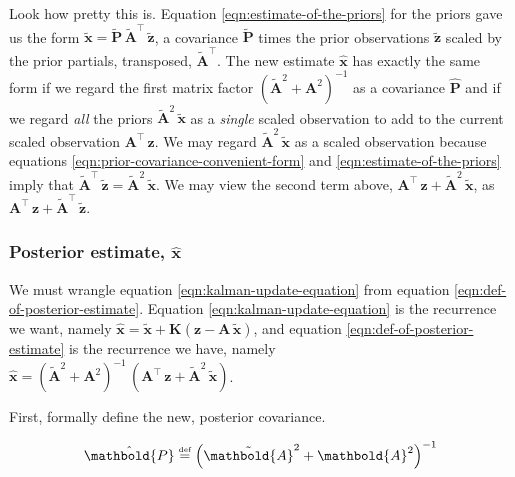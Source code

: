 \documentclass[10pt,oneside,x11names]{article}
\begin{document}
Look how pretty this is. Equation \ref{eqn:estimate-of-the-priors} for the
priors gave us the form
\(\tilde{\mathbold{x}}= \tilde{\mathbold{P}}\,
\tilde{\mathbold{A}}^\intercal\,\tilde{\mathbold{z}}\), a covariance 
\(\tilde{\mathbold{P}}\)
times  the prior observations 
\(\tilde{\mathbold{z}}\)
scaled by the prior partials, transposed, 
\(\tilde{\mathbold{A}}^\intercal\). 
The new estimate \(\hat{\mathbold{x}}\) has exactly
the same form if we regard the first matrix factor
\(\left({\tilde{\mathbold{A}}}^2 + \mathbold{A}^2 \right)^{-1}\) 
as a  covariance
\(\hat{\mathbold{P}}\)  and if
we regard \emph{all} the priors \({\tilde{\mathbold{A}}}^2\,{\tilde{\mathbold{x}}}\) as a \emph{single}
scaled observation
to add to the current scaled observation \(\mathbold{A}^\intercal\,\mathbold{z}\).
We may regard \({\tilde{\mathbold{A}}^2}\,\tilde{\mathbold{x}}\) as a scaled
observation because
equations
\ref{eqn:prior-covariance-convenient-form}
and
\ref{eqn:estimate-of-the-priors}
imply that
\({\tilde{\mathbold{A}}^\intercal}\,\tilde{\mathbold{z}}={\tilde{\mathbold{A}}^2}\,\tilde{\mathbold{x}}\). 
We may view the second term above,
\(\mathbold{A}^\intercal\,
\mathbold{z} + 
{\tilde{\mathbold{A}}}^2\,
{\tilde{\mathbold{x}}}\), 
as
\(\mathbold{A}^\intercal\,
\mathbold{z} + 
{\tilde{\mathbold{A}}}^\intercal\,
{\tilde{\mathbold{z}}}\).

\subsubsection{Posterior estimate, \(\hat{\mathbold{x}}\)}
\label{sec:orgheadline12}

We must wrangle 
equation
\ref{eqn:kalman-update-equation}
from
equation
\ref{eqn:def-of-posterior-estimate}.
Equation 
\ref{eqn:kalman-update-equation}
is the recurrence we want,
namely 
\(\hat{\mathbold{x}}=\tilde{\mathbold{x}}+\mathbold{K}(\mathbold{z}-\mathbold{A}\,\tilde{\mathbold{x}})\),
and equation
\ref{eqn:def-of-posterior-estimate}
is the recurrence we have, namely\\
\(\hat{\mathbold{x}}
=
\left(
{\tilde{\mathbold{A}}}^2 + 
\mathbold{A}^2
\right)^{-1}\,
\left(
\mathbold{A}^\intercal\,
\mathbold{z} + 
{\tilde{\mathbold{A}}}^2\,
{\tilde{\mathbold{x}}}
\right)\).

First, formally define the new, posterior covariance.

\begin{equation}
\label{eqn:new-p-hat-definition}
{\hat{\mathbold{P}}}
\stackrel{\text{\tiny def}}{=}
\left(
{\tilde{\mathbold{A}}}^2 + \mathbold{A}^2
\right)^{-1}
\end{equation}
\end{document}
